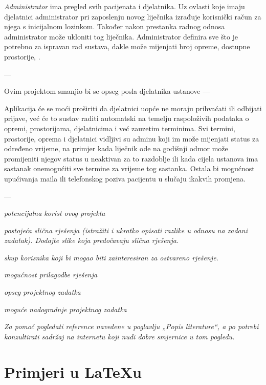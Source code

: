 		\textit{Administrator} ima pregled svih pacijenata i djelatnika. Uz ovlasti koje imaju djelatnici administrator pri zaposlenju novog liječnika izrađuje korisnički račun za njega s inicijalnom lozinkom. Također nakon prestanka radnog odnosa administrator može ukloniti tog liječnika. Administrator definira sve što je potrebno za ispravan rad sustava, dakle može mijenjati broj opreme, dostupne prostorije, .
		
		---
		
		Ovim projektom smanjio bi se opseg posla djelatnika ustanove 
		---
		
		Aplikacija će se moći proširiti da djelatnici uopće ne moraju prihvaćati ili odbijati prijave, već će to sustav raditi automatski na temelju raspoloživih podataka o opremi, prostorijama, djelatnicima i već zauzetim terminima. Svi termini, prostorije, oprema i djelatnici vidljivi su adminu koji im može mijenjati status za određeno vrijeme, na primjer kada liječnik ode na godišnji odmor može promijeniti njegov status u neaktivan za to razdoblje ili kada cijela ustanova ima sastanak onemogućiti sve termine za vrijeme tog sastanka. Ostala bi mogućnost upućivanja maila ili telefonskog poziva pacijentu u slučaju ikakvih promjena. 
		
		
		---
		
	
		
		\begin{packed_item}
			\item \textit{potencijalna korist ovog projekta}
			\item \textit{postojeća slična rješenja (istražiti i ukratko opisati razlike u odnosu na zadani zadatak). Dodajte slike koja predočavaju slična rješenja.}
			\item \textit{skup korisnika koji bi mogao biti zainteresiran za ostvareno rješenje.}
			\item \textit{mogućnost prilagodbe rješenja }
			\item \textit{opseg projektnog zadatka}
			\item \textit{moguće nadogradnje projektnog zadatka}
		\end{packed_item}
		
		\textit{Za pomoć pogledati reference navedene u poglavlju „Popis literature“, a po potrebi konzultirati sadržaj na internetu koji nudi dobre smjernice u tom pogledu.}
		\eject
		
		\section{Primjeri u \LaTeX u}
		

